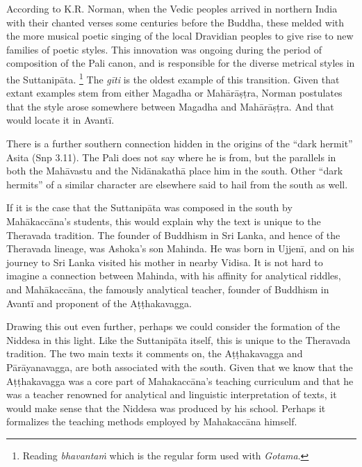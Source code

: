 \documentclass[12pt,openany]{book}%
\begin{document}
According to K.R. Norman, when the Vedic peoples arrived in northern India with their chanted verses some centuries before the Buddha, these melded with the more musical poetic singing of the local Dravidian peoples to give rise to new families of poetic styles. This innovation was ongoing during the period of composition of the Pali canon, and is responsible for the diverse metrical styles in the \textsanskrit{Suttanipāta}. \footnote{Reading \textit{\textsanskrit{bhavantaṁ}} which is the regular form used with \textit{Gotama}. } The \textit{\textsanskrit{gīti}} is the oldest example of this transition. Given that extant examples stem from either Magadha or \textsanskrit{Mahārāṣṭra}, Norman postulates that the style arose somewhere between Magadha and \textsanskrit{Mahārāṣṭra}. And that would locate it in \textsanskrit{Avantī}.

There is a further southern connection hidden in the origins of the “dark hermit” Asita (Snp 3.11). The Pali does not say where he is from, but the parallels in both the \textsanskrit{Mahāvastu} and the \textsanskrit{Nidānakathā} place him in the south. Other “dark hermits” of a similar character are elsewhere said to hail from the south as well.

If it is the case that the \textsanskrit{Suttanipāta} was composed in the south by \textsanskrit{Mahākaccāna}’s students, this would explain why the text is unique to the Theravada tradition. The founder of Buddhism in Sri Lanka, and hence of the Theravada lineage, was Ashoka’s son Mahinda. He was born in \textsanskrit{Ujjenī}, and on his journey to Sri Lanka visited his mother in nearby Vidisa. It is not hard to imagine a connection between Mahinda, with his affinity for analytical riddles, and \textsanskrit{Mahākaccāna}, the famously analytical teacher, founder of Buddhism in \textsanskrit{Avantī} and proponent of the \textsanskrit{Aṭṭhakavagga}.

Drawing this out even further, perhaps we could consider the formation of the Niddesa in this light. Like the \textsanskrit{Suttanipāta} itself, this is unique to the Theravada tradition. The two main texts it comments on, the \textsanskrit{Aṭṭhakavagga} and \textsanskrit{Pārāyanavagga}, are both associated with the south. Given that we know that the \textsanskrit{Aṭṭhakavagga} was a core part of \textsanskrit{Mahakaccāna}’s teaching curriculum and that he was a teacher renowned for analytical and linguistic interpretation of texts, it would make sense that the Niddesa was produced by his school. Perhaps it formalizes the teaching methods employed by \textsanskrit{Mahakaccāna} himself.
\end{document}
